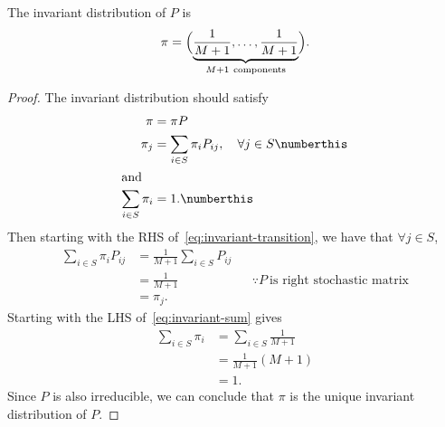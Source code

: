 \documentclass[
  coursecode={MTHE 455},
  assignmentname={Assignment \assignmentnumber},
  studentnumber=20053722,
  name={Bryan Hoang},
  draft,
]{
  ltxanswer%
}
\begin{document}
  \begin{questions}
    \setcounter{question}{\questionnumber}
    \addtocounter{question}{-1}
    \question[5]\
    \begin{parts}
      \part{}
      \begin{solution}
        \begin{claim}
          The invariant distribution of \(P\) is
          \begin{equation*}
            \pi = \Bigl(\underbrace{\frac{1}{M+1},\dotsc,\frac{1}{M+1}}_{M+1\ \text{components}}\Bigr).
          \end{equation*}
        \end{claim}
        \begin{proof}
          The invariant distribution should satisfy
          \begin{align*}
            \pi                    &= \pi P                                                                                          \\
            \pi_{j}                &= \sum_{i \in S} \pi_{i} P_{ij}, \quad \forall j \in S\numberthis\label{eq:invariant-transition} \\
            \intertext{and}
            \sum_{i \in S} \pi_{i} &= 1.\numberthis\label{eq:invariant-sum}
          \end{align*}
          Then starting with the RHS of~\eqref{eq:invariant-transition}, we have that \(\forall j \in S\),
          \begin{align*}
            \sum_{i \in S} \pi_{i} P_{ij} &= \frac{1}{M+1} \sum_{i \in S} P_{ij}                                                   \\
                                          &= \frac{1}{M+1}                       & &\because P\ \text{is  right stochastic matrix} \\
                                          &= \pi_{j}.
          \end{align*}
          Starting with the LHS of~\eqref{eq:invariant-sum} gives
          \begin{align*}
            \sum_{i \in S} \pi_{i} &= \sum_{i \in S} \frac{1}{M+1} \\
                                   &= \frac{1}{M+1} (M+1)          \\
                                   &= 1.
          \end{align*}
          Since \(P\) is also irreducible, we can conclude that \(\pi\) is the unique invariant distribution of \(P\).
        \end{proof}
      \end{solution}


\end{parts}
\end{questions}
\end{document}
